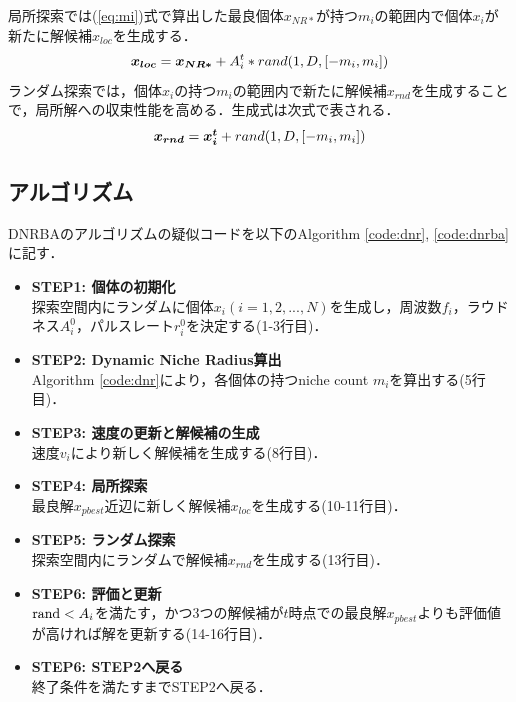 \documentclass[a4j,11pt]{jarticle}
\begin{document}
局所探索では(\ref{eq:mi})式で算出した最良個体$x_{NR*}$が持つ$m_i$の範囲内で個体$x_i$が新たに解候補$x_{loc}$を生成する．
\begin{equation}
\label{eq:dnrloc}
\mbox{\boldmath $x_{loc}$}=\mbox{\boldmath $x_{NR*}$} + A_i^t*rand(1,D,[-m_i, m_i])
\end{equation}
ランダム探索では，個体$x_i$の持つ$m_i$の範囲内で新たに解候補$x_{rnd}$を生成することで，局所解への収束性能を高める．生成式は次式で表される．
\begin{equation}
\label{eq:dnrrnd}
\mbox{\boldmath $x_{rnd}$}=\mbox{\boldmath $x_i^t$} + rand(1,D,[-m_i, m_i])
\end{equation}

\subsection{アルゴリズム}
\label{sss:DNRBA-algorithm}
DNRBAのアルゴリズムの疑似コードを以下のAlgorithm \ref{code:dnr}, \ref{code:dnrba}に記す．

\begin{itemize}
\item {\bf STEP1: 個体の初期化}\\
探索空間内にランダムに個体$x_i (i=1,2,...,N)$を生成し，周波数$f_i$，ラウドネス$A_i^0$，パルスレート$r_i^0$を決定する(1-3行目)．
\item {\bf STEP2: Dynamic Niche Radius算出}\\
Algorithm \ref{code:dnr}により，各個体の持つniche count $m_i$を算出する(5行目)．
\item {\bf STEP3: 速度の更新と解候補の生成}\\
速度$v_i$により新しく解候補を生成する(8行目)．
\item {\bf STEP4: 局所探索}\\
最良解$x_{pbest}$近辺に新しく解候補$x_{loc}$を生成する(10-11行目)．
\item {\bf STEP5: ランダム探索}\\
探索空間内にランダムで解候補$x_{rnd}$を生成する(13行目)．
\item {\bf STEP6: 評価と更新}\\
${\rm rand} < A_i$を満たす，かつ3つの解候補が$t$時点での最良解$x_{pbest}$よりも評価値が高ければ解を更新する(14-16行目)．
\item {\bf STEP6: STEP2へ戻る}\\
終了条件を満たすまでSTEP2へ戻る．
\end{itemize}
\end{document}
